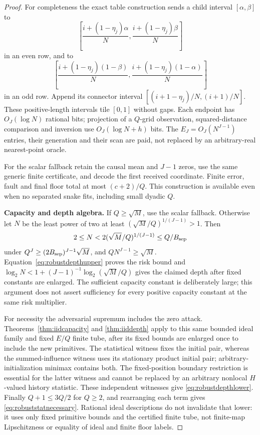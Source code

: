 \documentclass[11pt,letterpaper]{article}
\theoremstyle{definition}\newtheorem{definition}[theorem]{Definition}
\theoremstyle{remark}\newtheorem{remark}[theorem]{Remark}
\begin{document}
\begin{proof}
For completeness the exact table construction sends a child interval $[\alpha,\beta]$ to
\[
 \left[\frac{i+(1-\eta_j)\alpha}{N},
       \frac{i+(1-\eta_j)\beta}{N}\right]
\]
in an even row, and to
\[
 \left[\frac{i+(1-\eta_j)(1-\beta)}{N},
       \frac{i+(1-\eta_j)(1-\alpha)}{N}\right]
\]
in an odd row. Append its connector interval $[(i+1-\eta_j)/N,(i+1)/N]$. These positive-length intervals tile $[0,1]$ without gaps. Each endpoint has $O_J(\log N)$ rational bits; projection of a $Q$-grid observation, squared-distance comparison and inversion use $O_J(\log N+h)$ bits. The $E_J=O_J(N^{J-1})$ entries, their generation and their scan are paid, not replaced by an arbitrary-real nearest-point oracle.

For the scalar fallback retain the causal mean and $J-1$ zeros, use the same generic finite certificate, and decode the first received coordinate. Finite error, fault and final floor total at most $(c+2)/Q$. This construction is available even when no separated snake fits, including small dyadic $Q$.

\smallskip\noindent\textbf{Capacity and depth algebra.}
If $Q\ge\sqrt M$, use the scalar fallback. Otherwise let $N$ be the least power of two at least $(\sqrt M/Q)^{1/(J-1)}>1$. Then
\[
 2\le N<2(\sqrt M/Q)^{1/(J-1)}\le Q/B_{\rm sep}
\]
under $Q^J\ge(2B_{\rm sep})^{J-1}\sqrt M$, and $QN^{J-1}\ge\sqrt M$. Equation~\eqref{eq:robustdepthupper} proves the risk bound and
$\log_2N<1+(J-1)^{-1}\log_2(\sqrt M/Q)$ gives the claimed depth after fixed constants are enlarged. The sufficient capacity constant is deliberately large; this argument does not assert sufficiency for every positive capacity constant at the same risk multiplier.

For necessity the adversarial supremum includes the zero attack. Theorems~\ref{thm:iidcapacity} and \ref{thm:iiddepth} apply to this same bounded ideal family and fixed $E/Q$ finite tube, after its fixed bounds are enlarged once to include the new primitives. The statistical witness fixes the initial pair, whereas the summed-influence witness uses its stationary product initial pair; arbitrary-initialization minimax contains both. The fixed-position boundary restriction is essential for the latter witness and cannot be replaced by an arbitrary nonlocal $H$-valued history statistic. These independent witnesses give \eqref{eq:robustdepthlower}. Finally $Q+1\le3Q/2$ for $Q\ge2$, and rearranging each term gives \eqref{eq:robuststatnecessary}. Rational ideal descriptions do not invalidate that lower: it uses only fixed primitive bounds and the certified finite tube, not finite-map Lipschitzness or equality of ideal and finite floor labels.
\end{proof}
\end{document}
